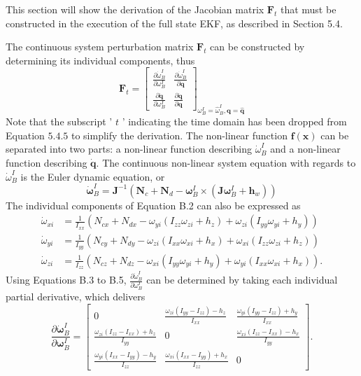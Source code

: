 This section will show the derivation of the Jacobian matrix $\mathbf{F}_{t}$ that must be constructed in the execution of the full state EKF, as described in Section 5.4.

The continuous system perturbation matrix $\mathbf{F}_{t}$ can be constructed by determining its individual components, thus
$$
\mathbf{F}_{t}=\left[\begin{array}{ll}
\frac{\partial \dot{\omega}_{B}^{I}}{\partial \omega_{B}^{I}} & \frac{\partial \dot{\omega}_{B}^{I}}{\partial \mathbf{q}} \\
\frac{\partial \dot{\mathbf{q}}}{\partial \omega_{B}^{I}} & \frac{\partial \dot{\mathbf{q}}}{\partial \mathbf{q}}
\end{array}\right]_{\omega_{B}^{I}=\hat{\omega}_{B}^{I}, \mathbf{q}=\hat{\mathbf{q}}}
$$
Note that the subscript ' $t$ ' indicating the time domain has been dropped from Equation $5.4 .5$ to simplify the derivation. The non-linear function $\boldsymbol{f}(\mathbf{x})$ can be separated into two parts: a non-linear function describing $\dot{\omega}_{B}^{I}$ and a non-linear function describing $\dot{\mathbf{q}}$. The continuous non-linear system equation with regards to $\dot{\omega}_{B}^{I}$ is the Euler dynamic equation, or
$$
\dot{\boldsymbol{\omega}}_{B}^{I}=\mathbf{J}^{-1}\left(\mathbf{N}_{c}+\mathbf{N}_{d}-\boldsymbol{\omega}_{B}^{I} \times\left(\mathbf{J} \boldsymbol{\omega}_{B}^{I}+\mathbf{h}_{w}\right)\right)
$$
The individual components of Equation B.2 can also be expressed as
$$
\begin{aligned}
\dot{\omega}_{x i} &=\frac{1}{I_{x x}}\left(N_{c x}+N_{d x}-\omega_{y i}\left(I_{z z} \omega_{z i}+h_{z}\right)+\omega_{z i}\left(I_{y y} \omega_{y i}+h_{y}\right)\right) \\
\dot{\omega}_{y i} &=\frac{1}{I_{y y}}\left(N_{c y}+N_{d y}-\omega_{z i}\left(I_{x x} \omega_{x i}+h_{x}\right)+\omega_{x i}\left(I_{z z} \omega_{z i}+h_{z}\right)\right) \\
\dot{\omega}_{z i} &=\frac{1}{I_{z z}}\left(N_{c z}+N_{d z}-\omega_{x i}\left(I_{y y} \omega_{y i}+h_{y}\right)+\omega_{y i}\left(I_{x x} \omega_{x i}+h_{x}\right)\right) .
\end{aligned}
$$
Using Equations B.3 to B.5, $\frac{\partial \dot{\omega}_{B}^{I}}{\partial \omega_{B}^{I}}$ can be determined by taking each individual partial derivative, which delivers
$$
\frac{\partial \dot{\boldsymbol{\omega}}_{B}^{I}}{\partial \boldsymbol{\omega}_{B}^{I}}=\left[\begin{array}{ccc}
0 & \frac{\omega_{z i}\left(I_{y y}-I_{z z}\right)-h_{z}}{I_{x x}} & \frac{\omega_{y i}\left(I_{y y}-I_{z z}\right)+h_{y}}{I_{x x}} \\
\frac{\omega_{z i}\left(I_{z z}-I_{x x}\right)+h_{z}}{I_{y y}} & 0 & \frac{\omega_{x i}\left(I_{z z}-I_{x x}\right)-h_{x}}{I_{y y}} \\
\frac{\omega_{y i}\left(I_{x x}-I_{y y}\right)-h_{y}}{I_{z z}} & \frac{\omega_{x i}\left(I_{x x}-I_{y y}\right)+h_{x}}{I_{z z}} & 0
\end{array}\right] .
$$
